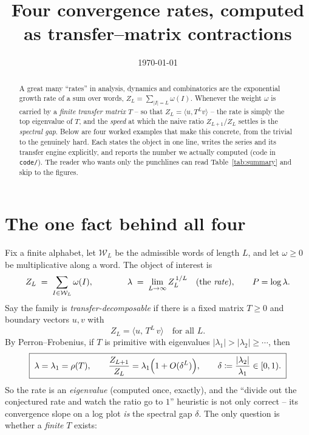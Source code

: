 \documentclass[11pt]{article}
\title{\bf Four convergence rates, computed as transfer--matrix contractions}
\date{\today}
\newcommand{\eqdef}{\coloneqq}
\newcommand{\spec}{\rho}                 %
\begin{document}
\maketitle
\vspace{-1.5em}

\begin{abstract}
\noindent
A great many ``rates'' in analysis, dynamics and combinatorics are the
exponential growth rate of a sum over words,
$Z_L=\sum_{|I|=L}\omega(I)$. Whenever the weight $\omega$ is carried by a
\emph{finite transfer matrix} $T$ -- so that $Z_L=\langle u,T^Lv\rangle$ -- the
rate is simply the top eigenvalue of $T$, and the \emph{speed} at which the naive
ratio $Z_{L+1}/Z_L$ settles is the \emph{spectral gap}. Below are four worked
examples that make this concrete, from the trivial to the genuinely hard. Each
states the object in one line, writes the series and its transfer engine
explicitly, and reports the number we actually computed (code in
\texttt{code/}). The reader who wants only the punchlines can read
Table~\ref{tab:summary} and skip to the figures.
\end{abstract}

\section*{The one fact behind all four}

Fix a finite alphabet, let $\mathcal W_L$ be the admissible words of length $L$,
and let $\omega\ge0$ be multiplicative along a word. The object of interest is
\begin{equation}
\label{eq:template}
   Z_L \;=\; \sum_{I\in\mathcal W_L}\omega(I),
   \qquad\qquad
   \lambda \;=\; \lim_{L\to\infty} Z_L^{\,1/L}
   \quad(\text{the \emph{rate}}),
   \qquad P=\log\lambda.
\end{equation}
Say the family is \emph{transfer-decomposable} if there is a fixed matrix
$T\ge0$ and boundary vectors $u,v$ with
\begin{equation}
\label{eq:transfer}
  \boxed{\,Z_L=\langle u,\,T^{L}\,v\rangle\quad\text{for all }L.\,}
\end{equation}
By Perron--Frobenius, if $T$ is primitive with eigenvalues
$|\lambda_1|>|\lambda_2|\ge\cdots$, then
\begin{equation}
\label{eq:rate-gap}
  \boxed{\;\lambda=\lambda_1=\spec(T),\qquad
  \frac{Z_{L+1}}{Z_L}=\lambda_1\Bigl(1+O(\delta^{L})\Bigr),\qquad
  \delta\eqdef\frac{|\lambda_2|}{\lambda_1}\in[0,1).\;}
\end{equation}
So the rate is an \emph{eigenvalue} (computed once, exactly), and the
``divide out the conjectured rate and watch the ratio go to $1$'' heuristic is
not only correct -- its convergence slope on a log plot \emph{is} the spectral
gap $\delta$. The only question is whether a \emph{finite} $T$ exists:
\end{document}
